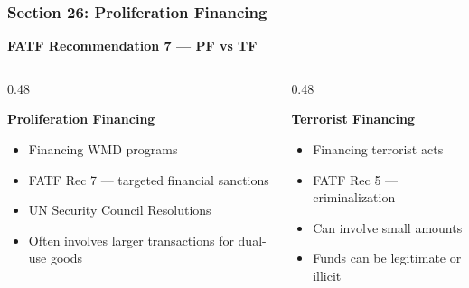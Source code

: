 \documentclass[12pt,aspectratio=169]{beamer}
\renewcommand{\scriptsize}{\fontsize{5}{6}\selectfont}
\begin{document}
	\begin{frame}
		\frametitle{\fontsize{13}{15}\selectfont \textbf{Section 26: Proliferation Financing}}
		\vspace{0.3cm}
		\begin{center}
			{\fontsize{12}{14}\selectfont \textbf{FATF Recommendation 7 — PF vs TF}}
		\end{center}
		\vspace{0.2cm}
		\begin{columns}[T]
			\begin{column}{0.48\textwidth}
				\begin{block}{\textbf{Proliferation Financing}}
					\scriptsize
					\begin{itemize}
						\item Financing WMD programs
						\item FATF Rec 7 — targeted financial sanctions
						\item UN Security Council Resolutions
						\item Often involves larger transactions for dual-use goods
					\end{itemize}
				\end{block}
			\end{column}
			\begin{column}{0.48\textwidth}
				\begin{block}{\textbf{Terrorist Financing}}
					\scriptsize
					\begin{itemize}
						\item Financing terrorist acts
						\item FATF Rec 5 — criminalization
						\item Can involve small amounts
						\item Funds can be legitimate or illicit
					\end{itemize}
				\end{block}
			\end{column}
		\end{columns}
	\end{frame}
	
\end{document}
